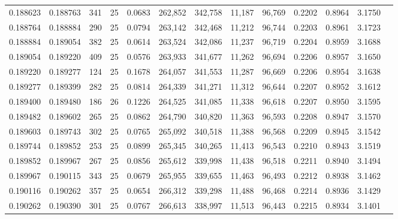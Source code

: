\begin{tabular}{rrrrrrrrrrrrr}
0.188623 & 0.188763 &   341 &  25 &                                     0.0683 & 262,852 & 342,758 &  11,187 &  96,769 & 0.2202 & 0.8964 & 3.1750 \\
0.188764 & 0.188884 &   290 &  25 &                                     0.0794 & 263,142 & 342,468 &  11,212 &  96,744 & 0.2203 & 0.8961 & 3.1723 \\
0.188884 & 0.189054 &   382 &  25 &                                     0.0614 & 263,524 & 342,086 &  11,237 &  96,719 & 0.2204 & 0.8959 & 3.1688 \\
0.189054 & 0.189220 &   409 &  25 &                                     0.0576 & 263,933 & 341,677 &  11,262 &  96,694 & 0.2206 & 0.8957 & 3.1650 \\
0.189220 & 0.189277 &   124 &  25 &                                     0.1678 & 264,057 & 341,553 &  11,287 &  96,669 & 0.2206 & 0.8954 & 3.1638 \\
0.189277 & 0.189399 &   282 &  25 &                                     0.0814 & 264,339 & 341,271 &  11,312 &  96,644 & 0.2207 & 0.8952 & 3.1612 \\
0.189400 & 0.189480 &   186 &  26 &                                     0.1226 & 264,525 & 341,085 &  11,338 &  96,618 & 0.2207 & 0.8950 & 3.1595 \\
0.189482 & 0.189602 &   265 &  25 &                                     0.0862 & 264,790 & 340,820 &  11,363 &  96,593 & 0.2208 & 0.8947 & 3.1570 \\
0.189603 & 0.189743 &   302 &  25 &                                     0.0765 & 265,092 & 340,518 &  11,388 &  96,568 & 0.2209 & 0.8945 & 3.1542 \\
0.189744 & 0.189852 &   253 &  25 &                                     0.0899 & 265,345 & 340,265 &  11,413 &  96,543 & 0.2210 & 0.8943 & 3.1519 \\
0.189852 & 0.189967 &   267 &  25 &                                     0.0856 & 265,612 & 339,998 &  11,438 &  96,518 & 0.2211 & 0.8940 & 3.1494 \\
0.189967 & 0.190115 &   343 &  25 &                                     0.0679 & 265,955 & 339,655 &  11,463 &  96,493 & 0.2212 & 0.8938 & 3.1462 \\
0.190116 & 0.190262 &   357 &  25 &                                     0.0654 & 266,312 & 339,298 &  11,488 &  96,468 & 0.2214 & 0.8936 & 3.1429 \\
0.190262 & 0.190390 &   301 &  25 &                                     0.0767 & 266,613 & 338,997 &  11,513 &  96,443 & 0.2215 & 0.8934 & 3.1401 \\

\end{tabular}
